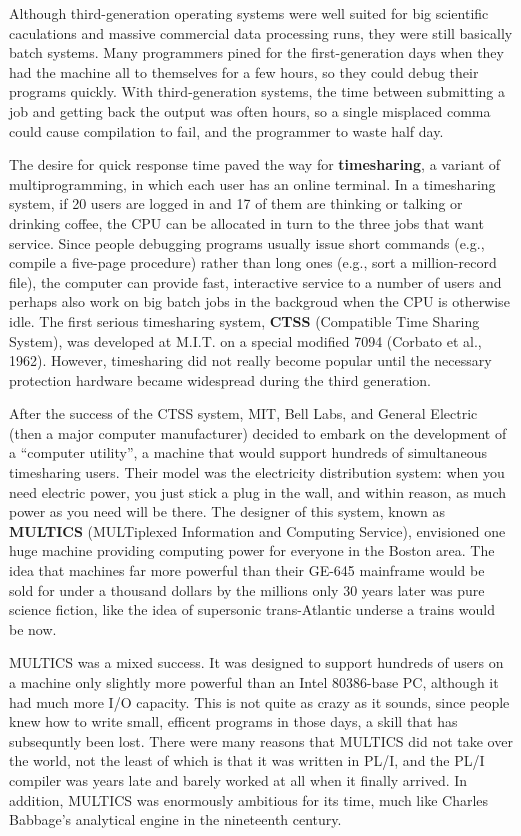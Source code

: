 \documentclass{book}
\newcommand {\kw}  [1] {\textbf{#1}}
\begin{document}
Although third-generation operating systems were well suited for big scientific caculations and massive commercial data processing runs, 
they were still basically batch systems.
Many programmers pined for the first-generation days when they had the machine all to themselves for a few hours, 
so they could debug their programs quickly.
With third-generation systems, the time between submitting a job and getting back the output was often hours, 
so a single misplaced comma could cause compilation to fail, and the programmer to waste half day.

The desire for quick response time paved the way for \kw{timesharing}, a variant of multiprogramming, in which each user has an online terminal.
In a timesharing system, if 20 users are logged in and 17 of them are thinking or talking or drinking coffee, 
the CPU can be allocated in turn to the three jobs that want service.
Since people debugging programs usually issue short commands (e.g., compile a five-page procedure) 
rather than long ones (e.g., sort a million-record file), the computer can provide fast, 
interactive service to a number of users and perhaps also work on big batch jobs in the backgroud when the CPU is otherwise idle.
The first serious timesharing system, \kw{CTSS} (Compatible Time Sharing System), was developed at M.I.T. 
on a special modified 7094 (Corbato et al., 1962). 
However, timesharing did not really become popular until the necessary protection hardware became widespread during the third generation. 

After the success of the CTSS system, MIT, Bell Labs, and General Electric (then a major computer manufacturer) decided to embark on 
the development of a ``computer utility'', a machine that would support hundreds of simultaneous timesharing users.
Their model was the electricity distribution system:
when you need electric power, you just stick a plug in the wall, and within reason, as much power as you need will be there.
The designer of this system, known as \kw{MULTICS} (MULTiplexed Information and Computing Service), 
envisioned one huge machine providing computing power for everyone in the Boston area.
The idea that machines far more powerful than their GE-645 mainframe would be sold for under a thousand dollars by the millions only 30 years later 
was pure science fiction, like the idea of supersonic trans-Atlantic underse a trains would be now.

MULTICS was a mixed success.
It was designed to support hundreds of users on a machine only slightly more powerful than an Intel 80386-base PC,
although it had much more I/O capacity.
This is not quite as crazy as it sounds, since people knew how to write small, efficent programs in those days, a skill that has subsequntly been lost.
There were many reasons that MULTICS did not take over the world, not the least of which is that it was written in PL/I, 
and the PL/I compiler was years late and barely worked at all when it finally arrived.
In addition, MULTICS was enormously ambitious for its time, much like Charles Babbage's analytical engine in the nineteenth century.
\end{document}
